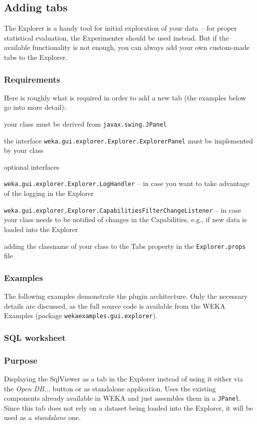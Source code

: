 \subsection{Adding tabs}
The Explorer is a handy tool for initial exploration of your data -- for
proper statistical evaluation, the Experimenter should be used instead. But if
the available functionality is not enough, you can always add your own
custom-made tabs to the Explorer.

\subsubsection{Requirements}
Here is roughly what is required in order to add a new tab (the examples below
go into more detail):
\begin{tight_itemize}
  \item your class must be derived from \texttt{javax.swing.JPanel}
  \item the interface \texttt{weka.gui.explorer.Explorer.ExplorerPanel} must be
implemented by your class
  \item optional interfaces
  \begin{tight_itemize}
	\item \texttt{weka.gui.explorer.Explorer.LogHandler} -- in case
you want to take advantage of the logging in the Explorer
	\item \texttt{weka.gui.explorer.Explorer.CapabilitiesFilterChangeListener}
-- in case your class needs to be notified of changes in the
Capabilities, e.g., if new data is loaded into the Explorer
  \end{tight_itemize}
  \item adding the classname of your class to the Tabs property in the
\texttt{Explorer.props} file
\end{tight_itemize}

\subsubsection{Examples}
The following examples demonstrate the plugin architecture. Only the
necessary details are discussed, as the full source code is available from the
WEKA Examples \cite{wekaexamples} (package \texttt{wekaexamples.gui.explorer}).

\subsubsection*{SQL worksheet}
\subsubsection*{Purpose}
Displaying the SqlViewer as a tab in the Explorer instead of using it either via
the \textit{Open DB...} button or as standalone application. Uses the existing
components already available in WEKA and just assembles them in a
\texttt{JPanel}. Since this tab does not rely on a dataset being loaded into the
Explorer, it will be used as a \textit{standalone} one.

